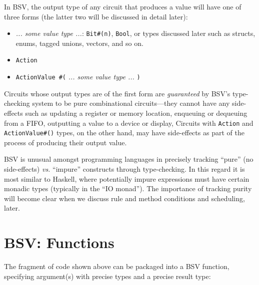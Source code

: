 
In BSV, the output type of any circuit that produces a value will have
one of three forms (the latter two will be discussed in detail later):

\begin{itemize}

\item \emph{... some value type ...}: \verb|Bit#(n)|, \verb|Bool|, or
types discussed later such as structs, enums, tagged unions, vectors,
and so on.

\item \verb|Action|

\item \verb|ActionValue #(| \emph{... some value type ...} \verb|)|

\end{itemize}

Circuits whose output types are of the first form are
\emph{guaranteed} by BSV's type-checking system to be pure
combinational circuits---they cannot have any side-effects such as
updating a register or memory location, enqueuing or dequeuing from a
FIFO, outputting a value to a device or display, {\etc} Circuits with
\verb|Action| and \verb|ActionValue#()| types, on the other hand, may
have side-effects as part of the process of producing their output
value.


BSV is unusual amongst programming languages in precisely tracking
``pure'' (no side-effects) \emph{vs.} ``impure'' constructs through
type-checking.  In this regard it is most similar to Haskell, where
potentially impure expressions must have certain monadic types
(typically in the ``IO monad'').  The importance of tracking purity
will become clear when we discuss rule and method conditions and
scheduling, later.



\section{BSV: Functions}

\label{BSV_functions}


The fragment of code shown above can be packaged into a BSV function,
specifying argument(s) with precise types and a precise result type:

